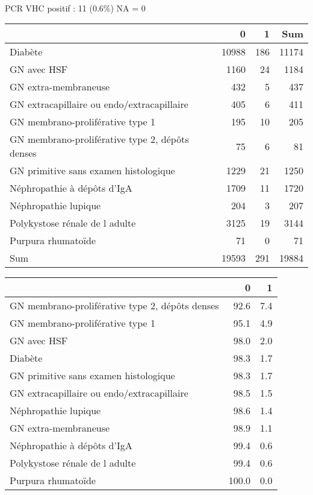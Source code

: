 \documentclass[11pt,a4paper]{article}\usepackage[]{graphicx}\usepackage[]{color}
\begin{document}
~\\

PCR VHC positif : 11 (0.6\%) NA = 0
\begin{table}[H]
\centering
\begin{tabular}{lrrr}
  \hline
 & 0 & 1 & Sum \\ 
  \hline
Diabète & 10988 & 186 & 11174 \\ 
  GN avec HSF & 1160 & 24 & 1184 \\ 
  GN extra-membraneuse & 432 & 5 & 437 \\ 
  GN extracapillaire ou endo/extracapillaire & 405 & 6 & 411 \\ 
  GN membrano-proliférative type 1 & 195 & 10 & 205 \\ 
  GN membrano-proliférative type 2, dépôts denses & 75 & 6 & 81 \\ 
  GN primitive sans examen histologique & 1229 & 21 & 1250 \\ 
  Néphropathie à dépôts d'IgA & 1709 & 11 & 1720 \\ 
  Néphropathie lupique & 204 & 3 & 207 \\ 
  Polykystose rénale de l adulte & 3125 & 19 & 3144 \\ 
  Purpura rhumatoïde & 71 & 0 & 71 \\ 
  Sum & 19593 & 291 & 19884 \\ 
   \hline
\end{tabular}
\end{table}
\begin{table}[H]
\centering
\begin{tabular}{lrr}
  \hline
 & 0 & 1 \\ 
  \hline
GN membrano-proliférative type 2, dépôts denses & 92.6 & 7.4 \\ 
  GN membrano-proliférative type 1 & 95.1 & 4.9 \\ 
  GN avec HSF & 98.0 & 2.0 \\ 
  Diabète & 98.3 & 1.7 \\ 
  GN primitive sans examen histologique & 98.3 & 1.7 \\ 
  GN extracapillaire ou endo/extracapillaire & 98.5 & 1.5 \\ 
  Néphropathie lupique & 98.6 & 1.4 \\ 
  GN extra-membraneuse & 98.9 & 1.1 \\ 
  Néphropathie à dépôts d'IgA & 99.4 & 0.6 \\ 
  Polykystose rénale de l adulte & 99.4 & 0.6 \\ 
  Purpura rhumatoïde & 100.0 & 0.0 \\ 
   \hline
\end{tabular}
\end{table}
\end{document}
